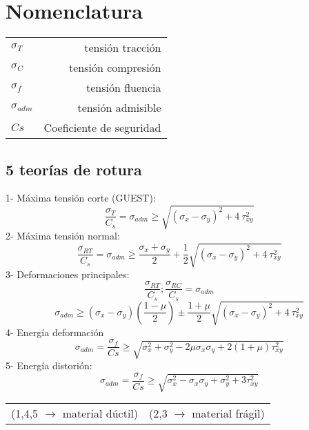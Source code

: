 \documentclass[11pt,a4paper]{article}
\begin{document}
\pagestyle{pieyencabezado}
\begin{multicols}{2}
	\section{Nomenclatura}
	\begin{tabular}{l r}
		$\sigma_{T}$&tensión tracción \\
		$\sigma_{C}$&tensión compresión\\
		$\sigma_{f}$&tensión fluencia\\
		$\sigma_{adm}$&tensión admisible\\
		$Cs$&Coeficiente de seguridad\\
	\end{tabular}
	
	\begin{cajita}
		\section*{5 teorías de rotura}
		\begin{flushleft}
			1- Máxima tensión corte (GUEST):
			\begin{equation*}
				\dfrac{\sigma_{T}}{C_{s}}=\sigma_{adm}\geq\sqrt{(\sigma_{x}-\sigma_{y})^{2}+4~\tau_{xy}^{2}}
			\end{equation*}
			2- Máxima tensión normal:
			\begin{equation*}
				\dfrac{\sigma_{RT}}{C_{s}}=\sigma_{adm}\geq\dfrac{\sigma_{x}+\sigma_{y}}{2}+\dfrac{1}{2}\sqrt{(\sigma_{x}-\sigma_{y})^{2}+4~\tau_{xy}^{2}}
			\end{equation*}
			3- Deformaciones principales:
			\begin{equation*}
				\dfrac{\sigma_{RT}}{C_{s}};\dfrac{\sigma_{RC}}{C_{s}}=\sigma_{adm}
			\end{equation*}
			\begin{equation*}
				\sigma_{adm}\geq(\sigma_{x}-\sigma_{y})\left(\dfrac{1-\mu}{2}\right)\pm\dfrac{1+\mu}{2}\sqrt{(\sigma_{x}-\sigma_{y})^{2}+4~\tau_{xy}^{2}}
			\end{equation*}
			4- Energía deformación
			\begin{equation*}
				\sigma_{adm}=\dfrac{\sigma_{f}}{Cs}\geq\sqrt{\sigma_{x}^{2}+\sigma_{y}^{2}-2\mu \sigma_{x} \sigma_{y} +2(1+\mu)\tau_{xy}^{2}}
			\end{equation*}
			5- Energía distorión:
			\begin{equation*}
				\sigma_{adm}=\dfrac{\sigma_{f}}{Cs}\geq\sqrt{\sigma_{x}^{2}-\sigma_{x} \sigma_{y}+\sigma_{y}^{2}+3\tau_{xy}^{2}}			
			\end{equation*}
		\end{flushleft}
		\begin{tabular}{l r}
			(1,4,5 $\rightarrow$ material dúctil) & (2,3 $\rightarrow$ material frágil)
		\end{tabular}
		
	\end{cajita}
\end{multicols}
\end{document}
